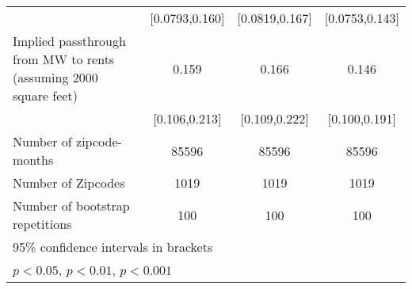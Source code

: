 {\begin{tabular}{l*{3}{c}}
            &        [0.0793,0.160]         &        [0.0819,0.167]         &        [0.0753,0.143]         \\
[1em]
Implied passthrough from MW to rents (assuming 2000 square feet)&                 0.159\sym{***}&                 0.166\sym{***}&                 0.146\sym{***}\\
            &         [0.106,0.213]         &         [0.109,0.222]         &         [0.100,0.191]         \\
\hline
Number of zipcode-months&                 85596         &                 85596         &                 85596         \\
Number of Zipcodes&                  1019         &                  1019         &                  1019         \\
Number of bootstrap repetitions&                   100         &                   100         &                   100         \\
\hline\hline
\multicolumn{4}{l}{\footnotesize 95\% confidence intervals in brackets}\\
\multicolumn{4}{l}{\footnotesize \sym{*} \(p<0.05\), \sym{**} \(p<0.01\), \sym{***} \(p<0.001\)}\\
\end{tabular}
}
